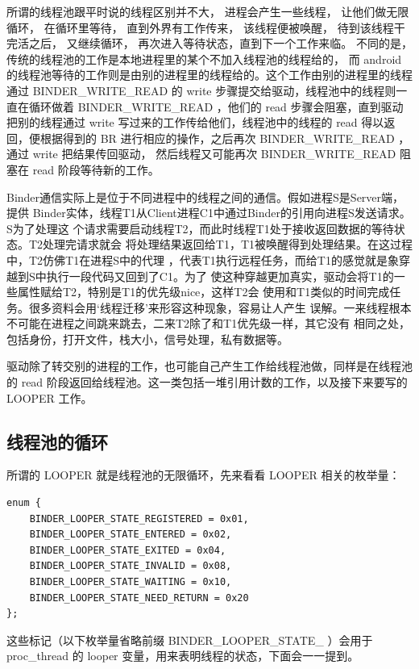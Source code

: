 \documentclass[a4paper,11pt]{article}
\begin{document}
所谓的线程池跟平时说的线程区别并不大， 进程会产生一些线程， 让他们做无限循环，
在循环里等待， 直到外界有工作传来， 该线程便被唤醒， 待到该线程干完活之后，
又继续循环， 再次进入等待状态，直到下一个工作来临。 不同的是，
传统的线程池的工作是本地进程里的某个不加入线程池的线程给的， 而 android
的线程池等待的工作则是由别的进程里的线程给的。这个工作由别的进程里的线程通过
BINDER_WRITE_READ 的 write 步骤提交给驱动，线程池中的线程则一直在循环做着
BINDER_WRITE_READ ，他们的 read 步骤会阻塞，直到驱动把别的线程通过 write
写过来的工作传给他们，线程池中的线程的 read 得以返回，便根据得到的 BR
进行相应的操作，之后再次 BINDER_WRITE_READ ，通过 write 把结果传回驱动，
然后线程又可能再次 BINDER_WRITE_READ 阻塞在 read 阶段等待新的工作。

Binder通信实际上是位于不同进程中的线程之间的通信。假如进程S是Server端，提供
Binder实体，线程T1从Client进程C1中通过Binder的引用向进程S发送请求。S为了处理这
个请求需要启动线程T2，而此时线程T1处于接收返回数据的等待状态。T2处理完请求就会
将处理结果返回给T1，T1被唤醒得到处理结果。在这过程中，T2仿佛T1在进程S中的代理
，代表T1执行远程任务，而给T1的感觉就是象穿越到S中执行一段代码又回到了C1。为了
使这种穿越更加真实，驱动会将T1的一些属性赋给T2，特别是T1的优先级nice，这样T2会
使用和T1类似的时间完成任务。很多资料会用‘线程迁移’来形容这种现象，容易让人产生
误解。一来线程根本不可能在进程之间跳来跳去，二来T2除了和T1优先级一样，其它没有
相同之处，包括身份，打开文件，栈大小，信号处理，私有数据等。

驱动除了转交别的进程的工作，也可能自己产生工作给线程池做，同样是在线程池的 read
阶段返回给线程池。这一类包括一堆引用计数的工作，以及接下来要写的 LOOPER 工作。

\subsection{线程池的循环}\label{protocol:threadpool}
所谓的 LOOPER 就是线程池的无限循环，先来看看 LOOPER 相关的枚举量：
\begin{lstlisting}[multicols=2,xleftmargin=3pt, caption=Binder Looper state]
enum {
    BINDER_LOOPER_STATE_REGISTERED = 0x01,
    BINDER_LOOPER_STATE_ENTERED = 0x02,
    BINDER_LOOPER_STATE_EXITED = 0x04,
    BINDER_LOOPER_STATE_INVALID = 0x08,
    BINDER_LOOPER_STATE_WAITING = 0x10,
    BINDER_LOOPER_STATE_NEED_RETURN = 0x20
};
\end{lstlisting}

这些标记（以下枚举量省略前缀 BINDER_LOOPER_STATE_ ）会用于 proc_thread 的
looper 变量，用来表明线程的状态，下面会一一提到。
\end{document}
